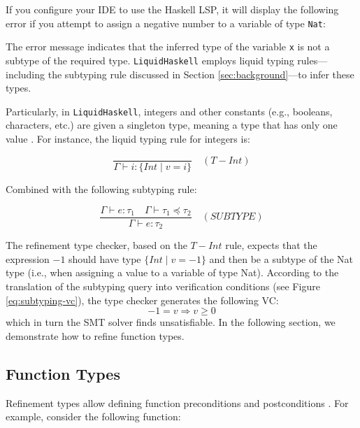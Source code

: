 \documentclass[]{rptuseminar}
\begin{document}
If you configure your IDE to use the Haskell LSP, it will display the following error if you attempt to assign a negative 
number to a variable of type \texttt{Nat}:


The error message indicates that the inferred type of the variable \texttt{x} is not a subtype of the 
required type. \texttt{LiquidHaskell} employs liquid typing rules—including the subtyping rule 
discussed in Section \ref{sec:background}—to infer these types.

Particularly, in \texttt{LiquidHaskell}, integers and other constants (e.g., booleans, characters, etc.) are given a
singleton type, meaning a type that has only one value \cite{niki_lecture_2024}. For instance, the liquid typing rule for integers is:

\[
\frac{
}{
\Gamma \vdash i: \{Int \mid v = i\}
} 
\quad (\mathit{T-Int})
\]

Combined with the following subtyping rule:

\[
\frac{
 \Gamma \vdash e: \tau_1  \quad \Gamma \vdash \tau_1 \preceq \tau_2
}{
 \Gamma \vdash e: \tau_2 
}
\quad (\mathit{SUBTYPE})
\]

The refinement type checker, based on the \(\mathit{T-Int}\) rule, expects that the expression \(-1\) should have type \(\{Int \mid v = -1\}\) 
and then be a subtype of the Nat type (i.e., when assigning a value to a variable of type Nat). 
According to the translation of the subtyping query into verification conditions (see Figure \ref{eq:subtyping-vc}), 
the type checker generates the following VC:
\[
-1 = v \Rightarrow v \geq 0
\]
which in turn the SMT solver finds unsatisfiable. In the following section,
we demonstrate how to refine function types.

\subsection{Function Types}

Refinement types allow defining function preconditions and postconditions \cite{jhala_programming_2020}. 
For example, consider the following function:
\end{document}
